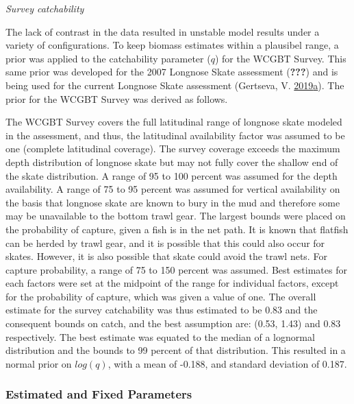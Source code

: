 \documentclass[12pt,]{article}
\begin{document}
\vspace{.5cm}

\emph{Survey catchability}

The lack of contrast in the data resulted in unstable model results
under a variety of configurations. To keep biomass estimates within a
plausibel range, a prior was applied to the catchability parameter
(\(q\)) for the WCGBT Survey. This same prior was developed for the 2007
Longnose Skate assessment ({\textbf{???}}) and is being used for the
current Longnose Skate assessment (Gertseva, V.
\protect\hyperlink{ref-Gertseva2019}{2019}\protect\hyperlink{ref-Gertseva2019}{a}).
The prior for the WCGBT Survey was derived as follows.

The WCGBT Survey covers the full latitudinal range of longnose skate
modeled in the assessment, and thus, the latitudinal availability factor
was assumed to be one (complete latitudinal coverage). The survey
coverage exceeds the maximum depth distribution of longnose skate but
may not fully cover the shallow end of the skate distribution. A range
of 95 to 100 percent was assumed for the depth availability. A range of
75 to 95 percent was assumed for vertical availability on the basis that
longnose skate are known to bury in the mud and therefore some may be
unavailable to the bottom trawl gear. The largest bounds were placed on
the probability of capture, given a fish is in the net path. It is known
that flatfish can be herded by trawl gear, and it is possible that this
could also occur for skates. However, it is also possible that skate
could avoid the trawl nets. For capture probability, a range of 75 to
150 percent was assumed. Best estimates for each factors were set at the
midpoint of the range for individual factors, except for the probability
of capture, which was given a value of one. The overall estimate for the
survey catchability was thus estimated to be 0.83 and the consequent
bounds on catch, and the best assumption are: (0.53, 1.43) and 0.83
respectively. The best estimate was equated to the median of a lognormal
distribution and the bounds to 99 percent of that distribution. This
resulted in a normal prior on \(log(q)\), with a mean of -0.188, and
standard deviation of 0.187.

\hypertarget{estimated-and-fixed-parameters}{%
\subsubsection{Estimated and Fixed
Parameters}\label{estimated-and-fixed-parameters}}
\end{document}
